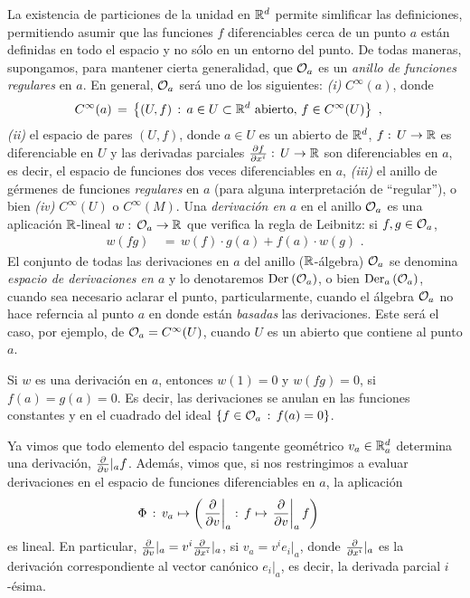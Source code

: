 La existencia de particiones de la unidad en $\bb{R}^{d}$ permite simlificar
las definiciones, permitiendo asumir que las funciones $f$ diferenciables
cerca de un punto $a$ est\'{a}n definidas en todo el espacio y no s\'{o}lo
en un entorno del punto. De todas maneras, supongamos, para mantener
cierta generalidad, que $\cal{O}_{a}$ es un \emph{anillo de funciones %
regulares} en $a$. En general, $\cal{O}_{a}$ ser\'{a} uno de los siguientes:
\textit{(i)} $C^{\infty}(a)$, donde
\begin{align*}
	C^{\infty}(a) & \,=\,\left\lbrace (U,f)\,:\, a\in U\subset\bb{R}^{d}
		\text{ abierto},\,f\in C^{\infty}(U)\right\rbrace
	\text{ ,}
\end{align*}
%
\textit{(ii)} el espacio de pares $(U,f)$, donde $a\in U$ es un abierto de
$\bb{R}^{d}$, $f:\,U\rightarrow\bb{R}$ es diferenciable en $U$ y las derivadas
parciales $\frac{\partial f}{\partial x^{i}}:\,U\rightarrow\bb{R}$ son
diferenciables en $a$, es decir, el espacio de funciones dos veces
diferenciables en $a$, \textit{(iii)} el anillo de g\'{e}rmenes de funciones
\emph{regulares} en $a$ (para alguna interpretaci\'{o}n de ``regular''), o
bien \textit{(iv)} $C^{\infty}(U)$ o $C^{\infty}(M)$. Una
\emph{derivaci\'{o}n en $a$} en el anillo $\cal{O}_{a}$ es una
aplicaci\'{o}n $\bb{R}$-lineal $w:\,\cal{O}_{a}\rightarrow\bb{R}$ que
verifica la regla de Leibnitz: si $f,g\in\cal{O}_{a}$,
\begin{align*}
	w(fg) & \,=\,w(f)\cdot g(a)+f(a)\cdot w(g)
	\text{ .}
\end{align*}
%
El conjunto de todas las derivaciones en $a$ del anillo ($\bb{R}$-\'{a}lgebra)
$\cal{O}_{a}$ se denomina \emph{espacio de derivaciones en $a$} y lo
denotaremos $\derivaciones{\cal{O}_{a}}$, o bien
$\derivaciones[a]{\cal{O}_{a}}$, cuando sea necesario aclarar el punto,
particularmente, cuando el \'{a}lgebra $\cal{O}_{a}$ no hace referncia al
punto $a$ en donde est\'{a}n \emph{basadas} las derivaciones. Este ser\'{a}
el caso, por ejemplo, de $\cal{O}_{a}=C^{\infty}(U)$, cuando $U$
es un abierto que contiene al punto $a$.

\begin{obsDerivaciones}\label{obs:derivaciones}
	Si $w$ es una derivaci\'{o}n en $a$, entonces $w(1)=0$ y
	$w(fg)=0$, si $f(a)=g(a)=0$. Es decir, las derivaciones se anulan
	en las funciones constantes y en el cuadrado del ideal
	$\{f\in\cal{O}_{a}\,:\,f(a)=0\}$.
\end{obsDerivaciones}

Ya vimos que todo elemento del espacio tangente geom\'{e}trico
$v_{a}\in\bb{R}^{d}_{a}$ determina una derivaci\'{o}n, $\gancho{v}|_{a}f$.
Adem\'{a}s, vimos que, si nos restringimos a evaluar derivaciones en el
espacio de funciones diferenciables en $a$, la aplicaci\'{o}n
\begin{align*}
	\Phi & \,:\,v_{a}\mapsto\left(
		\left.\gancho{v}\right|_{a}:\,f\mapsto
		\left.\gancho{v}\right|_{a}f\right)
\end{align*}
%
es lineal. En particular, $\gancho{v}|_{a}=v^{i}\gancho{x^{i}}|_{a}$,
si $v_{a}=v^{i}e_{i}|_{a}$, donde $\gancho{x^{i}}|_{a}$ es la derivaci\'{o}n
correspondiente al vector can\'{o}nico $e_{i}|_{a}$, es decir, la derivada
parcial $i$-\'{e}sima.

